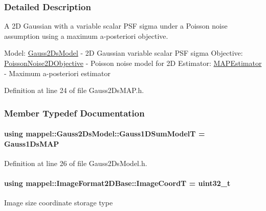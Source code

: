 \subsubsection{Detailed Description}
A 2D Gaussian with a variable scalar P\+SF sigma under a Poisson noise assumption using a maximum a-\/posteriori objective. 

Model\+: \hyperlink{classmappel_1_1Gauss2DsModel}{Gauss2\+Ds\+Model} -\/ 2D Gaussian variable scalar P\+SF sigma Objective\+: \hyperlink{classmappel_1_1PoissonNoise2DObjective}{Poisson\+Noise2\+D\+Objective} -\/ Poisson noise model for 2D Estimator\+: \hyperlink{classmappel_1_1MAPEstimator}{M\+A\+P\+Estimator} -\/ Maximum a-\/posteriori estimator 

Definition at line 24 of file Gauss2\+Ds\+M\+A\+P.\+h.



\subsubsection{Member Typedef Documentation}
\paragraph[{\texorpdfstring{Gauss1\+D\+Sum\+ModelT}{Gauss1DSumModelT}}]{\setlength{\rightskip}{0pt plus 5cm}using {\bf mappel\+::\+Gauss2\+Ds\+Model\+::\+Gauss1\+D\+Sum\+ModelT} =  {\bf Gauss1\+Ds\+M\+AP}\hspace{0.3cm}{\ttfamily [inherited]}}\hypertarget{classmappel_1_1Gauss2DsModel_a23ae68443a62f76405e6f08f6dec4fb7}{}\label{classmappel_1_1Gauss2DsModel_a23ae68443a62f76405e6f08f6dec4fb7}


Definition at line 26 of file Gauss2\+Ds\+Model.\+h.

\paragraph[{\texorpdfstring{Image\+CoordT}{ImageCoordT}}]{\setlength{\rightskip}{0pt plus 5cm}using {\bf mappel\+::\+Image\+Format2\+D\+Base\+::\+Image\+CoordT} =  uint32\+\_\+t\hspace{0.3cm}{\ttfamily [inherited]}}\hypertarget{classmappel_1_1ImageFormat2DBase_a45e9234d63c357f34ca56c72c12b9e9c}{}\label{classmappel_1_1ImageFormat2DBase_a45e9234d63c357f34ca56c72c12b9e9c}
Image size coordinate storage type 

